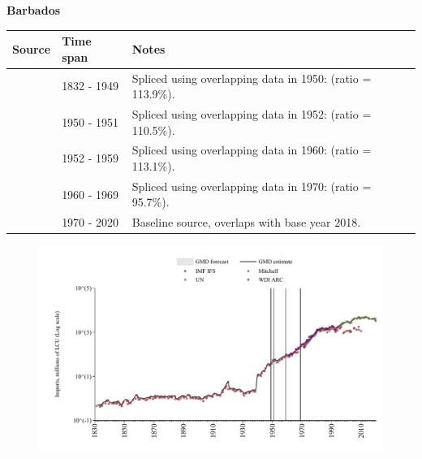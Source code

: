 \documentclass[12pt,a4paper,landscape]{article}
\begin{document}
\begin{adjustbox}{max totalsize={\paperwidth}{\paperheight},center}
\begin{minipage}[t][\textheight][t]{\textwidth}
\vspace*{0.5cm}
{}
\begin{center}
{\Large\bfseries Barbados}
\end{center}
\vspace{0.5cm}
\begin{table}[H]
\centering
\small
\begin{tabular}{|l|l|l|}
\hline
\textbf{Source} & \textbf{Time span} & \textbf{Notes} \\
\hline
\rowcolor{white}\cite{Mitchell}& 1832 - 1949 &Spliced using overlapping data in 1950: (ratio = 113.9\%).\\
\rowcolor{lightgray}\cite{IMF_IFS}& 1950 - 1951 &Spliced using overlapping data in 1952: (ratio = 110.5\%).\\
\rowcolor{white}\cite{Mitchell}& 1952 - 1959 &Spliced using overlapping data in 1960: (ratio = 113.1\%).\\
\rowcolor{lightgray}\cite{WDI_ARC}& 1960 - 1969 &Spliced using overlapping data in 1970: (ratio = 95.7\%).\\
\rowcolor{white}\cite{UN}& 1970 - 2020 &Baseline source, overlaps with base year 2018.\\
\hline
\end{tabular}
\end{table}
\begin{figure}[H]
\centering
\includegraphics[width=\textwidth,height=0.6\textheight,keepaspectratio]{graphs/BRB_imports.pdf}
\end{figure}
\end{minipage}
\end{adjustbox}
\end{document}
